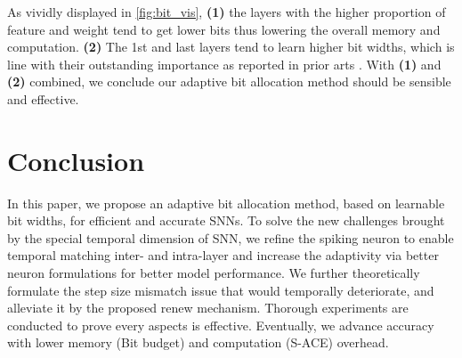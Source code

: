 As vividly displayed in  \cref{fig:bit_vis}, \textbf{(1)} the layers with the higher proportion of feature and weight tend to get lower bits thus lowering the overall memory and computation. \textbf{(2)} The 1st and last layers tend to learn higher bit widths, which is line with their outstanding importance as reported in prior arts \cite{choi2018pact}. With \textbf{(1)} and \textbf{(2)} combined, we conclude our adaptive bit allocation method should be sensible and effective.









\section{Conclusion}
\label{sec:conclusion}
In this paper, we propose an adaptive bit allocation method, based on learnable bit widths, for efficient and accurate SNNs. 
To solve the new challenges brought by the special temporal dimension of SNN, we refine the spiking neuron to enable temporal matching inter- and intra-layer and increase the adaptivity via better neuron formulations for better model performance. We further theoretically formulate the step size mismatch issue that would temporally deteriorate, and alleviate it by the proposed renew mechanism.
Thorough experiments are conducted to prove every aspects is effective. 
Eventually, we advance accuracy with lower memory (Bit budget) and computation (S-ACE) overhead.